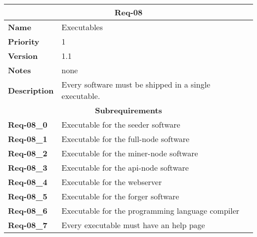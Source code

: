 \documentclass[../documentation.tex]{subfiles}
\begin{document}
\bgroup{}
\def\arraystretch{1.25}
\begin{center}
    \begin{tabular}{ |l|p{9cm}| }
        \hline
        \multicolumn{2}{|c|}{\textbf{Req-08}} \\
        \hline
        \textbf{Name} & Executables \\
        \hline
        \textbf{Priority} & 1 \\
        \hline
        \textbf{Version} & 1.1 \\
        \hline
        \textbf{Notes} & none \\
        \hline
        \textbf{Description} & Every software must be shipped in a single executable. \\
        \hline
        \multicolumn{2}{|c|}{\textbf{Subrequirements}} \\
        \hline
        \textbf{Req-08\_0} & Executable for the seeder software \\
        \hline
        \textbf{Req-08\_1} & Executable for the full-node software \\
        \hline
        \textbf{Req-08\_2} & Executable for the miner-node software \\
        \hline
        \textbf{Req-08\_3} & Executable for the api-node software \\
        \hline
        \textbf{Req-08\_4} & Executable for the webserver \\
        \hline
        \textbf{Req-08\_5} & Executable for the forger software \\
        \hline
        \textbf{Req-08\_6} & Executable for the programming language compiler \\
        \hline
        \textbf{Req-08\_7} & Every executable must have an help page \\
        \hline
    \end{tabular}
\end{center}
\egroup{}
\end{document}
